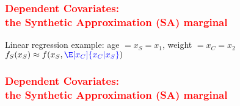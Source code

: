 \documentclass[11pt,dvipsnames,usenames,times]{beamer}
\begin{document}
\begin{frame}\frametitle{\bf%
\textcolor{red}{Dependent Covariates:\\ the Synthetic Approximation (SA) marginal}}
Linear regression example: age $=x_S=x_1$, weight $=x_C=x_2$\\
$f_S(x_S) \approx f(x_S, \textcolor{blue}{\E[x_C]{x_C|x_S}})$
\begin{center}
\end{center}
\end{frame}

\begin{frame}\frametitle{\bf%
\textcolor{red}{Dependent Covariates:\\ the Synthetic Approximation (SA) marginal}}


\end{frame}
\end{document}
